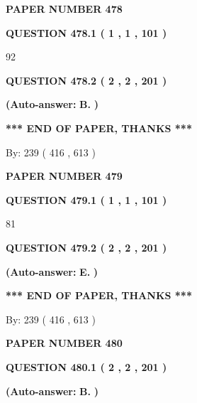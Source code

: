 \documentclass[12pt]{article}
\begin{document}
   
\newpage 
\setcounter{page}{ 
   478001 } 
   
   
 {\textbf{ \Large{ PAPER NUMBER  478  }}}
   
   
   
   
  
  
{\textbf{\large{QUESTION
478.1 
 ( 1 , 1 , 101 )
}}}

92
  
  
{\textbf{\large{QUESTION
478.2 
 ( 2 , 2 , 201 )
}}}
 
 
{\textbf{(Auto-answer:}}
{\textbf{\large{
B.}}}
{\textbf{)}}
 
 
   
   
   
   
\vspace{1.0in} 
{\textbf{\large{ *** END OF PAPER, THANKS *** }}} 
   
   
\hspace{1.0in} By: 
 239 ( 416 ,  613 )
   
   
   
   
\newpage 
\setcounter{page}{ 
   479001 } 
   
   
 {\textbf{ \Large{ PAPER NUMBER  479  }}}
   
   
   
   
  
  
{\textbf{\large{QUESTION
479.1 
 ( 1 , 1 , 101 )
}}}

81
  
  
{\textbf{\large{QUESTION
479.2 
 ( 2 , 2 , 201 )
}}}
 
 
{\textbf{(Auto-answer:}}
{\textbf{\large{
E.}}}
{\textbf{)}}
 
 
   
   
   
   
\vspace{1.0in} 
{\textbf{\large{ *** END OF PAPER, THANKS *** }}} 
   
   
\hspace{1.0in} By: 
 239 ( 416 ,  613 )
   
   
   
   
\newpage 
\setcounter{page}{ 
   480001 } 
   
   
 {\textbf{ \Large{ PAPER NUMBER  480  }}}
   
   
   
   
  
  
{\textbf{\large{QUESTION
480.1 
 ( 2 , 2 , 201 )
}}}
 
 
{\textbf{(Auto-answer:}}
{\textbf{\large{
B.}}}
{\textbf{)}}
 
 
  
\end{document}
